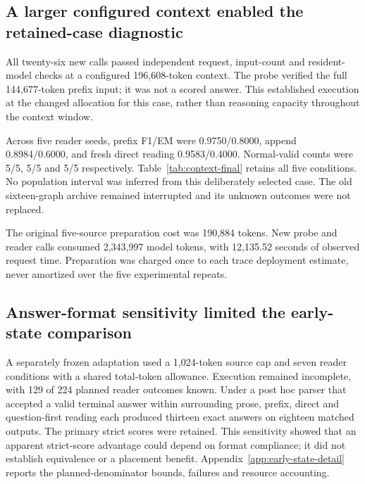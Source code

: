 \subsection{A larger configured context enabled the retained-case diagnostic}
\label{sec:context-diagnostic}
All twenty-six new calls passed independent request, input-count and resident-model checks at a configured 196,608-token context. The probe verified the full 144,677-token prefix input; it was not a scored answer. This established execution at the changed allocation for this case, rather than reasoning capacity throughout the context window.

Across five reader seeds, prefix F1/EM were 0.9750/0.8000, append 0.8984/0.6000, and fresh direct reading 0.9583/0.4000. Normal-valid counts were 5/5, 5/5 and 5/5 respectively. Table~\ref{tab:context-final} retains all five conditions. No population interval was inferred from this deliberately selected case. The old sixteen-graph archive remained interrupted and its unknown outcomes were not replaced.

The original five-source preparation cost was 190,884 tokens. New probe and reader calls consumed 2,343,997 model tokens, with 12,135.52 seconds of observed request time. Preparation was charged once to each trace deployment estimate, never amortized over the five experimental repeats.




\subsection{Answer-format sensitivity limited the early-state comparison}
A separately frozen adaptation used a 1,024-token source cap and seven reader conditions with a shared total-token allowance. Execution remained incomplete, with 129 of 224 planned reader outcomes known. Under a post hoc parser that accepted a valid terminal answer within surrounding prose, prefix, direct and question-first reading each produced thirteen exact answers on eighteen matched outputs. The primary strict scores were retained. This sensitivity showed that an apparent strict-score advantage could depend on format compliance; it did not establish equivalence or a placement benefit. Appendix~\ref{app:early-state-detail} reports the planned-denominator bounds, failures and resource accounting.

